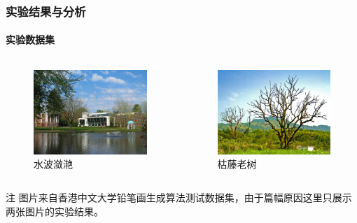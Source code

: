 \documentclass[aspectratio=43, xcolor=svgnames, t, 10pt]{beamer}
\begin{document}
\begin{frame}
  \frametitle{实验结果与分析}
  \framesubtitle{实验数据集}
  \begin{columns}
    \begin{column}{0.5\linewidth}
      \begin{figure}
        \includegraphics[width=\linewidth]{./figure/test-01.jpg}
        \caption{水波潋滟}
      \end{figure}
    \end{column}
    \begin{column}{0.5\linewidth}
      \begin{figure}
        \includegraphics[width=\linewidth]{./figure/test-03.jpg}
        \caption{枯藤老树}
      \end{figure}
    \end{column}
  \end{columns}
  \begin{block}{注}
    图片来自香港中文大学铅笔画生成算法测试数据集，由于篇幅原因这里只展示两张图片的实验结果。
  \end{block}
\end{frame}
\end{document}
